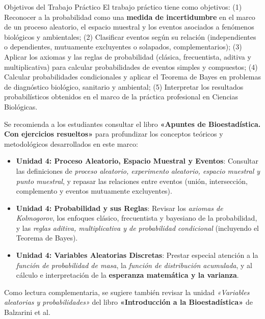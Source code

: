 \documentclass[
  spanish,
  letterpaper,
  DIV=11,
  numbers=noendperiod]{scrreprt}
\providecommand{\tightlist}{%
  \setlength{\itemsep}{0pt}\setlength{\parskip}{0pt}}
\begin{document}
Objetivos del Trabajo Práctico El trabajo práctico tiene como objetivos:
(1) Reconocer a la probabilidad como una \textbf{medida de
incertidumbre} en el marco de un proceso aleatorio, el espacio muestral
y los eventos asociados a fenómenos biológicos y ambientales; (2)
Clasificar eventos según su relación (independientes o dependientes,
mutuamente excluyentes o solapados, complementarios); (3) Aplicar los
axiomas y las reglas de probabilidad (clásica, frecuentista, aditiva y
multiplicativa) para calcular probabilidades de eventos simples y
compuestos; (4) Calcular probabilidades condicionales y aplicar el
Teorema de Bayes en problemas de diagnóstico biológico, sanitario y
ambiental; (5) Interpretar los resultados probabilísticos obtenidos en
el marco de la práctica profesional en Ciencias Biológicas.

\begin{tcolorbox}[enhanced jigsaw, arc=.35mm, bottomrule=.15mm, bottomtitle=1mm, breakable, colback=white, colbacktitle=quarto-callout-important-color!10!white, colframe=quarto-callout-important-color-frame, coltitle=black, left=2mm, leftrule=.75mm, opacityback=0, opacitybacktitle=0.6, rightrule=.15mm, title=\textcolor{quarto-callout-important-color}{\faExclamation}\hspace{0.5em}{Lectura Sugerida para el Trabajo Práctico}, titlerule=0mm, toprule=.15mm, toptitle=1mm]

Se recomienda a los estudiantes consultar el libro \textbf{«Apuntes de
Bioestadística. Con ejercicios resueltos»} para profundizar los
conceptos teóricos y metodológicos desarrollados en este marco:

\begin{itemize}
\tightlist
\item
  \textbf{Unidad 4: Proceso Aleatorio, Espacio Muestral y Eventos}:
  Consultar las definiciones de \emph{proceso aleatorio, experimento
  aleatorio, espacio muestral y punto muestral}, y repasar las
  relaciones entre eventos (unión, intersección, complemento y eventos
  mutuamente excluyentes).
\item
  \textbf{Unidad 4: Probabilidad y sus Reglas}: Revisar los
  \emph{axiomas de Kolmogorov}, los enfoques clásico, frecuentista y
  bayesiano de la probabilidad, y las \emph{reglas aditiva,
  multiplicativa y de probabilidad condicional} (incluyendo el Teorema
  de Bayes).
\item
  \textbf{Unidad 4: Variables Aleatorias Discretas}: Prestar especial
  atención a la \emph{función de probabilidad de masa}, la \emph{función
  de distribución acumulada}, y al cálculo e interpretación de la
  \textbf{esperanza matemática y la varianza}.
\end{itemize}

Como lectura complementaria, se sugiere también revisar la unidad
\emph{«Variables aleatorias y probabilidades»} del libro
\textbf{«Introducción a la Bioestadística»} de Balzarini et al.

\end{tcolorbox}
\end{document}
